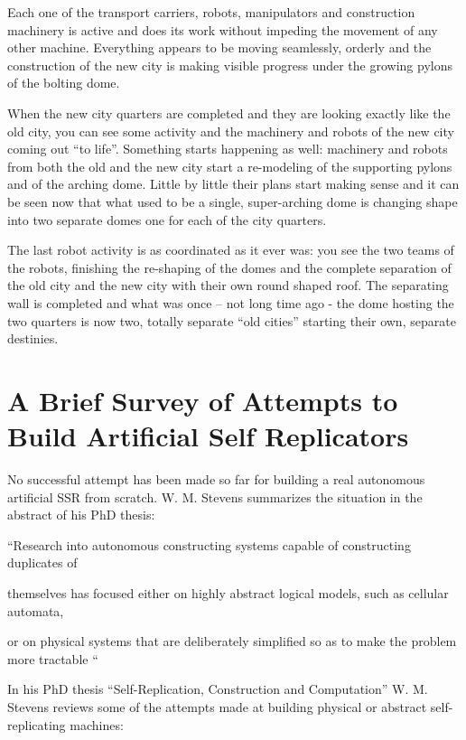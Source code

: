 Each one of the transport carriers, robots, manipulators and
construction machinery is active and does its work without impeding the
movement of any other machine. Everything appears to be moving
seamlessly, orderly and the construction of the new city is making
visible progress under the growing pylons of the bolting dome.

When the new city quarters are completed and they are looking exactly
like the old city, you can see some activity and the machinery and
robots of the new city coming out “to life”. Something starts happening
as well: machinery and robots from both the old and the new city start
a re-modeling of the supporting pylons and of the arching dome. Little
by little their plans start making sense and it can be seen now that
what used to be a single, super-arching dome is changing shape into two
separate domes one for each of the city quarters.

The last robot activity is as coordinated as it ever was: you see the
two teams of the robots, finishing the re-shaping of the domes and the
complete separation of the old city and the new city with their own
round shaped roof. The separating wall is completed and what was once –
not long time ago - the dome hosting the two quarters is now two,
totally separate “old cities” starting their own, separate destinies.

\section{A Brief Survey of Attempts to Build Artificial Self Replicators}

No successful attempt has been made so far for building a real
autonomous artificial SSR from scratch. W. M. Stevens summarizes the
situation in the abstract of his PhD thesis:

“Research into autonomous constructing systems capable of constructing
duplicates of

themselves has focused either on highly abstract logical models, such as
cellular automata,

or on physical systems that are deliberately simplified so as to make
the problem more tractable “

In his PhD thesis “Self-Replication, Construction and Computation” W. M.
Stevens reviews some of the attempts made at building physical or
abstract self-replicating machines:


